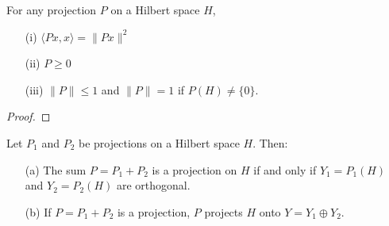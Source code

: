 \begin{theorem}\label{9.5-2}
   For any projection \( P  \) on a Hilbert space \( H  \), 
   \begin{enumerate}
       \item[(i)] \( \langle Px , x  \rangle = \|Px\|^{2} \)
        \item[(ii)] \( P \geq 0  \) 
        \item[(iii)] \( \|P\| \leq   1  \) and \( \|P\| = 1  \) if \( P(H) \neq \{ 0 \}  \).
   \end{enumerate}
\end{theorem}
\begin{proof}

\end{proof}

\begin{theorem}
    Let \( {P}_{1} \) and \( {P}_{2} \) be projections on a Hilbert space \( H  \). Then:
    \begin{enumerate}
    \item[(a)] The sum \( P = {P}_{1} + {P}_{2} \) is a projection on \( H  \) if and only if \( {Y}_{1} = {P}_{1}(H) \) and \( {Y}_{2} = {P}_{2}(H) \) are orthogonal.
    \item[(b)] If \( P = {P}_{1} + {P}_{2}  \) is a projection, \( P  \) projects \( H \) onto \( Y = {Y}_{1} \oplus {Y}_{2} \). 
    \end{enumerate}
\end{theorem}
